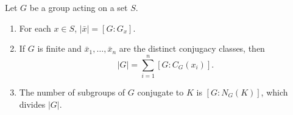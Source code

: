 Let $G$ be a group acting on a set $S$.
\begin{enumerate}
\item[(i)] For each $x \in S$, $|\bar{x}| = [G : G_x]$.
\item[(ii)] If $G$ is finite and $\bar{x}_1, \ldots, \bar{x}_n$ are the distinct conjugacy classes, then
$$|G| = \sum_{i=1}^{n} [G : C_G(x_i)].$$
\item[(iii)] The number of subgroups of $G$ conjugate to $K$ is $[G : N_G(K)]$, which divides $|G|$.
\end{enumerate}
